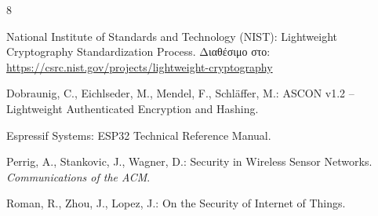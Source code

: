 \documentclass[runningheads]{llncs}
\begin{document}
\begin{thebibliography}{8} 
    
    
National Institute of Standards and Technology (NIST):
\newblock Lightweight Cryptography Standardization Process.
\newblock Διαθέσιμο στο: \url{https://csrc.nist.gov/projects/lightweight-cryptography}

Dobraunig, C., Eichlseder, M., Mendel, F., Schläffer, M.:
\newblock ASCON v1.2 – Lightweight Authenticated Encryption and Hashing.

Espressif Systems:
\newblock ESP32 Technical Reference Manual.

Perrig, A., Stankovic, J., Wagner, D.:
\newblock Security in Wireless Sensor Networks.
\newblock \textit{Communications of the ACM}.

Roman, R., Zhou, J., Lopez, J.:
\newblock On the Security of Internet of Things.

\end{thebibliography}


\end{document}
